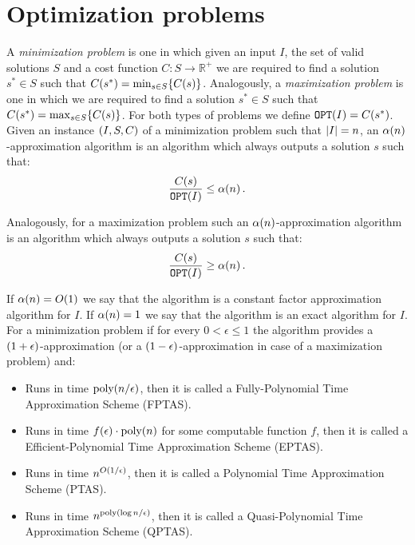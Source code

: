 \section{Optimization problems}
\label{sec:optimization_problems}
A \textit{minimization problem} is one in which given an input $I$, the set of valid solutions $S$ and a cost function $C:S \to \mathbb{R}^+$ we are required to find a solution $s^*\in S$ such that $C\mathopen{}\left( s^* \right)=\min_{s\in S}\mathopen{}\left\{ C\mathopen{}\left( s \right) \right\}$. Analogously, a \textit{maximization problem} is one in which we are required to find a solution $s^*\in S$ such that $C\mathopen{}\left( s^* \right)=\max_{s\in S}\mathopen{}\left\{ C\mathopen{}\left( s \right) \right\}$. For both types of problems we define $\texttt{OPT}\mathopen{}\left( I \right) = C\mathopen{}\left( s^* \right)$. Given an instance $\mathopen{}\left( I, S, C \right)$ of a minimization problem such that $\mathopen{}\left| I \right| = n$, an $\alpha\mathopen{}\left( n \right)$-approximation algorithm is an algorithm which always outputs a solution $s$ such that:
$$
\frac{C\mathopen{}\left( s \right)}{\texttt{OPT}\mathopen{}\left( I \right)} \leq \alpha\mathopen{}\left( n \right).
$$

Analogously, for a maximization problem such an $\alpha\mathopen{}\left( n \right)$-approximation algorithm is an algorithm which always outputs a solution $s$ such that:
$$
\frac{C\mathopen{}\left( s \right)}{\texttt{OPT}\mathopen{}\left( I \right)} \geq \alpha\mathopen{}\left( n \right).
$$

If $\alpha\mathopen{}\left( n \right)=O\mathopen{}\left( 1 \right)$ we say that the algorithm is a constant factor approximation algorithm for $I$. If $\alpha\mathopen{}\left( n \right)=1$ we say that the algorithm is an exact algorithm for $I$. For a minimization problem if for every $0<\epsilon\leq1$ the algorithm provides a $\mathopen{}\left( 1+\epsilon \right)$-approximation (or a $\mathopen{}\left( 1-\epsilon \right)$-approximation in case of a maximization problem) and:
\begin{itemize}
    \item Runs in time $\text{poly}\mathopen{}\left( n/\epsilon \right)$, then it is called a Fully-Polynomial Time Approximation Scheme (FPTAS).
    \item Runs in time $f\mathopen{}\left( \epsilon \right)\cdot\text{poly}\mathopen{}\left( n \right)$ for some computable function $f$, then it is called a Efficient-Polynomial Time Approximation Scheme (EPTAS).
    \item Runs in time $n^{O\mathopen{}\left( 1/\epsilon \right)}$, then it is called a Polynomial Time Approximation Scheme (PTAS).
    \item Runs in time $n^{\text{poly}\mathopen{}\left( \log n/\epsilon \right)}$, then it is called a Quasi-Polynomial Time Approximation Scheme (QPTAS).
\end{itemize}
